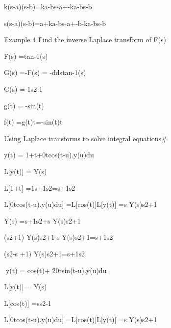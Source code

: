  
k(s-a)(s-b)=ka-bs-a+-ka-bs-b
 
 
s(s-a)(s-b)=a+ka-bs-a+-b-ka-bs-b


 
Example 4 	 	         Find the inverse Laplace transform of  F(s)

F(s) =tan-1(s)

G(s) =-F(s) = -ddstan-1(s)

G(s) =-1s2-1

g(t) = -sin(t)

f(t) =g(t)t=-sin(t)t
 
 
Using Laplace transforms to solve integral equations#
 
 y(t) = 1+t+0tcos(t-u).y(u)du
 
L[y(t)] = Y(s)
 
L[1+t] =1s+1s2=s+1s2
 
L[0tcos(t-u).y(u)du] =L[cos(t)]L[y(t)] =s Y(s)s2+1
 
Y(s) =s+1s2+s Y(s)s2+1
 
(s2+1) Y(s)s2+1-s Y(s)s2+1=s+1s2
 
(s2-s +1) Y(s)s2+1=s+1s2
 
 

y(t) = cos(t)+ 20tsin(t-u).y(u)du

 
 
L[y(t)] = Y(s)
 
L[cos(t)] =ss2-1
 
L[0tcos(t-u).y(u)du] =L[cos(t)]L[y(t)] =s Y(s)s2+1

